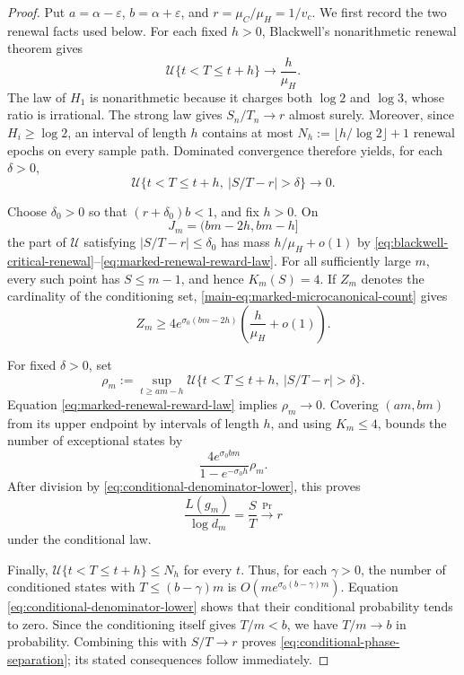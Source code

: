 \begin{proof}
Put \(a=\alpha-\varepsilon\), \(b=\alpha+\varepsilon\), and
\(r=\mu_C/\mu_H=1/v_c\).  We first record the two renewal facts used below.
For each fixed \(h>0\), Blackwell's nonarithmetic renewal theorem
\cite[Ch.~XI]{Feller1971} gives
\begin{equation}
 \mathcal U\{t<T\le t+h\}\longrightarrow\frac h{\mu_H}.
 \label{eq:blackwell-critical-renewal}
\end{equation}
The law of \(H_1\) is nonarithmetic because it charges both \(\log2\) and
\(\log3\), whose ratio is irrational.  The strong law gives
\(S_n/T_n\to r\) almost surely.  Moreover, since \(H_i\ge\log2\), an interval
of length \(h\) contains at most
\(N_h:=\lfloor h/\log2\rfloor+1\) renewal epochs on every sample path.
Dominated convergence therefore yields, for each \(\delta>0\),
\begin{equation}
 \mathcal U\{t<T\le t+h,\ |S/T-r|>\delta\}\longrightarrow0.
 \label{eq:marked-renewal-reward-law}
\end{equation}

Choose \(\delta_0>0\) so that \((r+\delta_0)b<1\), and fix \(h>0\).
On
\[
 J_m=(bm-2h,bm-h]
\]
the part of \(\mathcal U\) satisfying \(|S/T-r|\le\delta_0\) has mass
\(h/\mu_H+o(1)\) by
\eqref{eq:blackwell-critical-renewal}--\eqref{eq:marked-renewal-reward-law}.
For all sufficiently large \(m\), every such point has \(S\le m-1\), and
hence \(K_m(S)=4\).  If \(Z_m\) denotes the cardinality of the conditioning
set, \eqref{main-eq:marked-microcanonical-count} gives
\begin{equation}
 Z_m\ge4e^{\sigma_0(bm-2h)}
       \left(\frac h{\mu_H}+o(1)\right).
 \label{eq:conditional-denominator-lower}
\end{equation}

For fixed \(\delta>0\), set
\[
 \rho_m:=\sup_{t\ge am-h}
 \mathcal U\{t<T\le t+h,\ |S/T-r|>\delta\}.
\]
Equation \eqref{eq:marked-renewal-reward-law} implies \(\rho_m\to0\).
Covering \((am,bm)\) from its upper endpoint by intervals of length \(h\),
and using \(K_m\le4\), bounds the number of exceptional states by
\[
 \frac{4e^{\sigma_0bm}}{1-e^{-\sigma_0h}}\rho_m.
\]
After division by \eqref{eq:conditional-denominator-lower}, this proves
\[
 \frac{L(g_m)}{\log d_m}=\frac ST\xrightarrow{\Pr}r
\]
under the conditional law.

Finally, \(\mathcal U\{t<T\le t+h\}\le N_h\) for every \(t\).  Thus, for
each \(\gamma>0\), the number of conditioned states with
\(T\le(b-\gamma)m\) is
\(O(me^{\sigma_0(b-\gamma)m})\).  Equation
\eqref{eq:conditional-denominator-lower} shows that their conditional
probability tends to zero.  Since the conditioning itself gives
\(T/m<b\), we have \(T/m\to b\) in probability.  Combining this with
\(S/T\to r\) proves \eqref{eq:conditional-phase-separation}; its stated
consequences follow immediately.
\end{proof}

